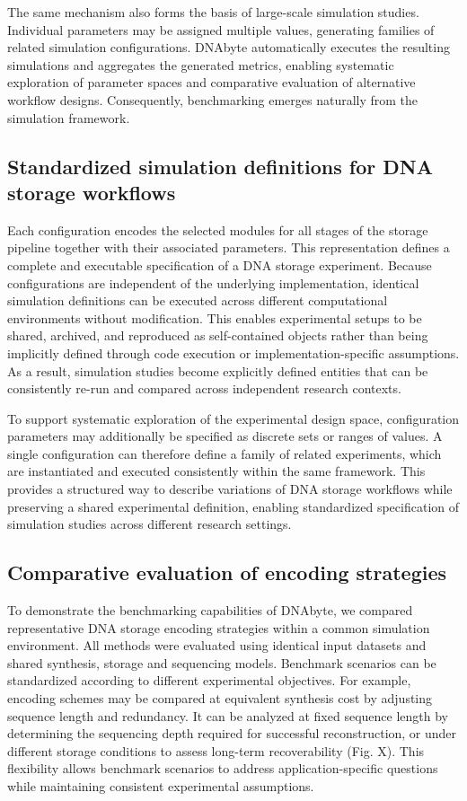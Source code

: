 \documentclass[pdflatex,sn-mathphys-num]{sn-jnl}%
\theoremstyle{thmstyleone}%
\theoremstyle{thmstyletwo}%
\theoremstyle{thmstylethree}%
\begin{document}
The same mechanism also forms the basis of large-scale simulation studies. Individual parameters may be assigned multiple values, generating families of related simulation configurations. DNAbyte automatically executes the resulting simulations and aggregates the generated metrics, enabling systematic exploration of parameter spaces and comparative evaluation of alternative workflow designs. Consequently, benchmarking emerges naturally from the simulation framework.

\subsection{Standardized simulation definitions for DNA storage workflows}
Each configuration encodes the selected modules for all stages of the storage pipeline together with their associated parameters. This representation defines a complete and executable specification of a DNA storage experiment. Because configurations are independent of the underlying implementation, identical simulation definitions can be executed across different computational environments without modification. This enables experimental setups to be shared, archived, and reproduced as self-contained objects rather than being implicitly defined through code execution or implementation-specific assumptions. As a result, simulation studies become explicitly defined entities that can be consistently re-run and compared across independent research contexts.

To support systematic exploration of the experimental design space, configuration parameters may additionally be specified as discrete sets or ranges of values. A single configuration can therefore define a family of related experiments, which are instantiated and executed consistently within the same framework. This provides a structured way to describe variations of DNA storage workflows while preserving a shared experimental definition, enabling standardized specification of simulation studies across different research settings.

\subsection{Comparative evaluation of encoding strategies}

To demonstrate the benchmarking capabilities of DNAbyte, we compared representative DNA storage encoding strategies within a common simulation environment. All methods were evaluated using identical input datasets and shared synthesis, storage and sequencing models. Benchmark scenarios can be standardized according to different experimental objectives. For example, encoding schemes may be compared at equivalent synthesis cost by adjusting sequence length and redundancy. It can be analyzed at fixed sequence length by determining the sequencing depth required for successful reconstruction, or under different storage conditions to assess long-term recoverability (Fig. X). This flexibility allows benchmark scenarios to address application-specific questions while maintaining consistent experimental assumptions.
\end{document}
